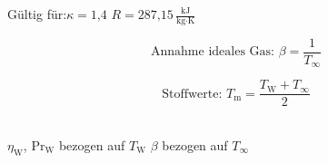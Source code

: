Gültig für:\qquad $\kappa = \text{1,4}$ \qquad $R = \text{287,15}\,\tfrac{\text{kJ}}{\text{kg}\cdot\text{K}}$\\
\begin{minipage}{0.3\textwidth}
    \centering
    \begin{equation*}
        \text{Annahme ideales Gas: } \beta = \frac{1}{T_\infty}
    \end{equation*}
\end{minipage}%
\begin{minipage}{0.26\textwidth}
    \centering
    \begin{equation*}
        \text{Stoffwerte: } T_\text{m} = \frac{T_\text{W} + T_\infty}{2}
    \end{equation*}
\end{minipage}
\\ \vspace{5mm}
$\eta_\text{W}$, $\text{Pr}_\text{W}$ bezogen auf $T_\text{W}$ \qquad $\beta$ bezogen auf $T_\infty$